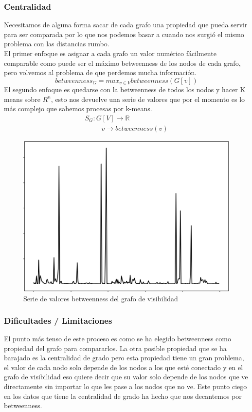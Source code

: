 \documentclass[12pt,a4paper]{article}
\begin{document}
			\subsubsection{Centralidad}
			Necesitamos de alguna forma sacar de cada grafo una propiedad que pueda servir para ser comparada por lo que nos podemos basar a cuando nos surgió el mismo problema con las distancias rumbo. \\
			El primer enfoque es asignar a cada grafo un valor numérico fácilmente comparable como puede ser el máximo betweenness de los nodos de cada grafo, pero volvemos al problema de que perdemos mucha información.\\
			\[betweenness_G =max_{v\in V} betweenness(G[v]) \]
			El segundo enfoque es quedarse con la betweenness de todos los nodos y hacer K means sobre $R^n$, esto nos devuelve una serie de valores que por el momento es lo más complejo que sabemos procesas por k-means.\\
			\[\begin{array}{lcc}
S_G:G[V] \rightarrow \mathbb{R}\\
 \ \ \ \ \ \ \ \ \ \ \ v \rightarrow betweenness(v)
\end{array}\]
\begin{figure}[H]
\centering
  \includegraphics[width=.9\linewidth]{betweenness}
  \caption{Serie de valores betweenness del grafo de visibilidad}
\end{figure}
			\subsubsection{Dificultades / Limitaciones}
			El punto más tenso de este proceso es como se ha elegido betweenness como propiedad del grafo para compararlos. La otra posible propiedad que se ha barajado es la centralidad de grado pero esta propiedad tiene un gran problema, el valor de cada nodo solo depende de los nodos a los que esté conectado y en el grafo de visibilidad eso quiere decir que su valor solo depende de los nodos que ve directamente sin importar lo que les pase a los nodos que no ve. Este punto ciego en los datos que tiene la centralidad de grado ha hecho que nos decantemos por betweenness.\\
\pagebreak	
\end{document}
